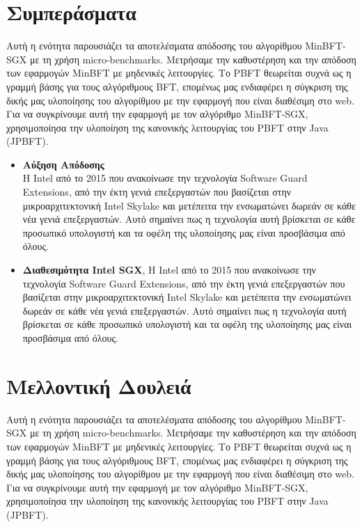 \section{Συμπεράσματα}
Αυτή η ενότητα παρουσιάζει τα αποτελέσματα απόδοσης του αλγορίθμου MinBFT-SGX με τη χρήση micro-benchmarks. Μετρήσαμε την καθυστέρηση και την απόδοση των εφαρμογών MinBFT με μηδενικές λειτουργίες. Το PBFT θεωρείται συχνά ως η γραμμή βάσης για τους αλγόριθμους BFT, επομένως μας ενδιαφέρει η σύγκριση της δικής μας υλοποίησης του αλγορίθμου με την εφαρμογή που είναι διαθέσιμη στο web. Για να συγκρίνουμε αυτή την εφαρμογή με τον αλγόριθμο MinBFT-SGX, χρησιμοποίησα την υλοποίηση της κανονικής λειτουργίας του PBFT στην Java (JPBFT).
\begin{itemize}
\item \textbf{Αύξηση Απόδοσης}\\
Η Intel από το 2015 που ανακοίνωσε την τεχνολογία Software Guard Extensions, από την έκτη γενιά επεξεργαστών που βασίζεται στην μικροαρχιτεκτονική Intel Skylake και μετέπειτα την ενσωματώνει δωρεάν σε κάθε νέα γενιά επεξεργαστών. Αυτό σημαίνει πως η τεχνολογία αυτή βρίσκεται σε κάθε προσωπικό υπολογιστή και τα οφέλη της υλοποίησης μας είναι προσβάσιμα από όλους.
\item \textbf{Διαθεσιμότητα Intel SGX}, Η Intel από το 2015 που ανακοίνωσε την τεχνολογία Software Guard Extensions, από την έκτη γενιά επεξεργαστών που βασίζεται στην μικροαρχιτεκτονική Intel Skylake και μετέπειτα την ενσωματώνει δωρεάν σε κάθε νέα γενιά επεξεργαστών. Αυτό σημαίνει πως η τεχνολογία αυτή βρίσκεται σε κάθε προσωπικό υπολογιστή και τα οφέλη της υλοποίησης μας είναι προσβάσιμα από όλους.
\end{itemize}


\section{Μελλοντική Δουλειά}
Αυτή η ενότητα παρουσιάζει τα αποτελέσματα απόδοσης του αλγορίθμου MinBFT-SGX με τη χρήση micro-benchmarks. Μετρήσαμε την καθυστέρηση και την απόδοση των εφαρμογών MinBFT με μηδενικές λειτουργίες. Το PBFT θεωρείται συχνά ως η γραμμή βάσης για τους αλγόριθμους BFT, επομένως μας ενδιαφέρει η σύγκριση της δικής μας υλοποίησης του αλγορίθμου με την εφαρμογή που είναι διαθέσιμη στο web. Για να συγκρίνουμε αυτή την εφαρμογή με τον αλγόριθμο MinBFT-SGX, χρησιμοποίησα την υλοποίηση της κανονικής λειτουργίας του PBFT στην Java (JPBFT).